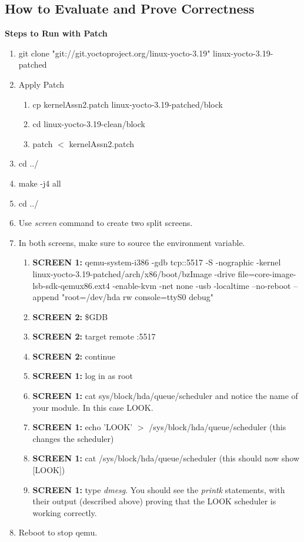\documentclass[draftclsnofoot, onecolumn, 10pt, compsoc]{IEEEtran}
\begin{document}
		\subsection{How to Evaluate and Prove Correctness}
			\textbf{Steps to Run with Patch}
			\begin{enumerate}
				\item git clone "git://git.yoctoproject.org/linux-yocto-3.19" linux-yocto-3.19-patched
				\item Apply Patch
				\begin{enumerate}
					\item cp kernelAssn2.patch linux-yocto-3.19-patched/block
					\item cd linux-yocto-3.19-clean/block
					\item patch $<$ kernelAssn2.patch
				\end{enumerate}
				\item cd ../
				\item make -j4 all
				\item cd ../
				\item Use \textit{screen} command to create two split screens.
				\item In both screens, make sure to source the environment variable.
				\begin{enumerate}
					\item \textbf{SCREEN 1:}
					qemu-system-i386 -gdb tcp::5517 -S -nographic -kernel linux-yocto-3.19-patched/arch/x86/boot/bzImage -drive file=core-image-lsb-sdk-qemux86.ext4 -enable-kvm -net none -usb -localtime --no-reboot --append "root=/dev/hda rw console=ttyS0 debug"
					\item \textbf{SCREEN 2:} \$GDB
					\item \textbf{SCREEN 2:} target remote :5517
					\item \textbf{SCREEN 2:} continue
					\item \textbf{SCREEN 1:} log in as root
					\item \textbf{SCREEN 1:} cat sys/block/hda/queue/scheduler and notice the name of your module. In this case LOOK.
					\item \textbf{SCREEN 1:} echo 'LOOK' $>$ /sys/block/hda/queue/scheduler (this changes the scheduler)
					\item \textbf{SCREEN 1:} cat /sys/block/hda/queue/scheduler (this should now show [LOOK])
					\item \textbf{SCREEN 1:} type \textit{dmesg}. You should see the \textit{printk} statements, with their output (described above) proving that the LOOK scheduler is working correctly.
				\end{enumerate}
				\item Reboot to stop qemu.
			\end{enumerate}
\end{document}
